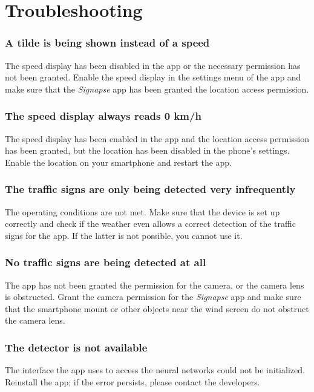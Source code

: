 \documentclass[12pt,a4paper,english,enabledeprecatedfontcommands]{article}
\begin{document}
\section{Troubleshooting}

\subsubsection*{A tilde is being shown instead of a speed}
The speed display has been disabled in the  app or the necessary permission has not been granted. Enable the speed display in the settings menu of the app and make sure that the \textit{Signapse} app has been granted the location access permission.

\subsubsection*{The speed display always reads 0 km/h}
The speed display has been enabled in the app and the location access permission has been granted, but the location has been disabled in the phone's settings. Enable the location on your smartphone and restart the app.

\subsubsection*{The traffic signs are only being detected very infrequently}
The operating conditions are not met. Make sure that the device is set up correctly and check if the weather even allows a correct detection of the traffic signs for the app. If the latter is not possible, you cannot use it.

\subsubsection*{No traffic signs are being detected at all}
The app has not been granted the permission for the camera, or the camera lens is obstructed. Grant the camera permission for the \textit{Signapse} app and make sure that the smartphone mount or other objects near the wind screen do not obstruct the camera lens.

\subsubsection*{The detector is not available}
The interface the app uses to access the neural networks could not be initialized. Reinstall the app; if the error persists, please contact the developers.
\end{document}
